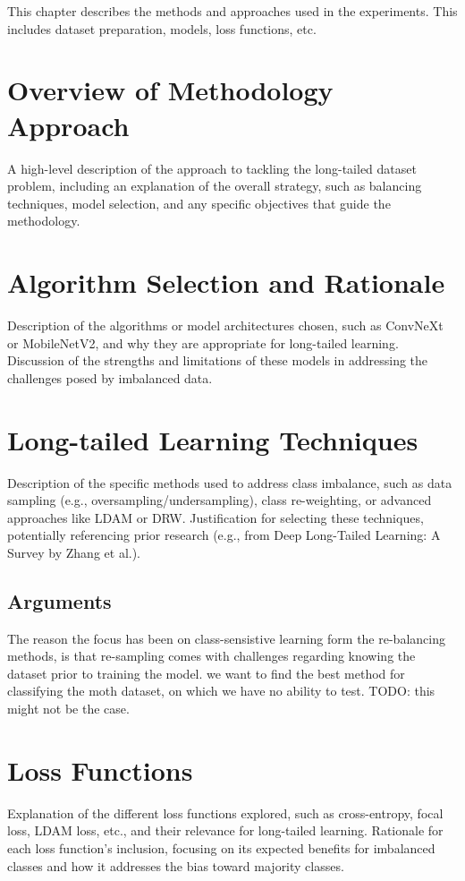 
This chapter describes the methods and approaches used in the experiments. This includes dataset preparation, models, loss functions, etc.

\section{Overview of Methodology Approach}
A high-level description of the approach to tackling the long-tailed dataset problem, including an explanation of the overall strategy, 
such as balancing techniques, model selection, and any specific objectives that guide the methodology.

\section{Algorithm Selection and Rationale}
Description of the algorithms or model architectures chosen, such as ConvNeXt or MobileNetV2, and why they are appropriate for long-tailed learning.
Discussion of the strengths and limitations of these models in addressing the challenges posed by imbalanced data.

\section{Long-tailed Learning Techniques}
Description of the specific methods used to address class imbalance, such as data sampling (e.g., oversampling/undersampling), class re-weighting, or advanced approaches like LDAM or DRW. 
Justification for selecting these techniques, potentially referencing prior research (e.g., from Deep Long-Tailed Learning: A Survey by Zhang et al.).

\subsection{Arguments}
The reason the focus has been on class-sensistive learning form the re-balancing methods, is that re-sampling comes with challenges regarding knowing the dataset prior to training the model. we want to find the best method for classifying the moth dataset, on which we have no ability to test. TODO: this might not be the case. 

\section{Loss Functions}
Explanation of the different loss functions explored, such as cross-entropy, focal loss, LDAM loss, etc., and their relevance for long-tailed learning.
Rationale for each loss function's inclusion, focusing on its expected benefits for imbalanced classes and how it addresses the bias toward majority classes.


